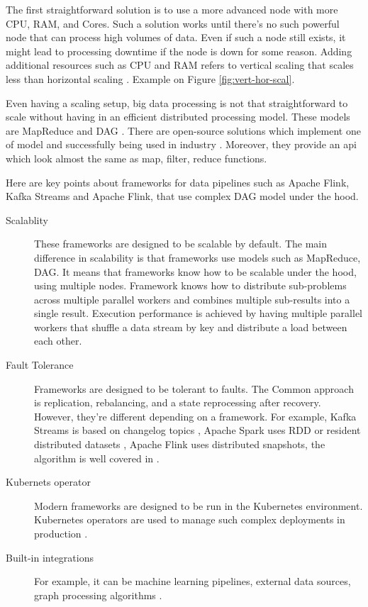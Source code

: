 The first straightforward solution is to use a more advanced node \cite{aws_node_types} with more CPU, RAM, and Cores.
Such a solution works until there's no such powerful node that can process high volumes of data.
Even if such a node still exists, it might lead to processing downtime if the node is down for some reason.
Adding additional resources such as CPU and RAM refers to vertical scaling that scales less than horizontal scaling \cite{vertical_horizontal_scalling_1}.
Example on Figure \ref{fig:vert-hor-scal}.

Even having a scaling setup, big data processing is not that straightforward to scale without having
in an efficient distributed processing model.
These models are MapReduce \cite{map_reduce_google, map_reduce_2, map_reduce_3} and DAG \cite{flink_dag, kafka_streams_topology}.
There are open-source solutions which implement one of model and successfully being used in industry \cite{flinkPoweredBy, netflixStreamingSQL}.
Moreover, they provide an api which
look almost the same as map, filter, reduce functions.

Here are key points about frameworks for data pipelines such as Apache Flink, Kafka Streams and
Apache Flink, that use complex DAG model under the hood.

\begin{description}
    \item[Scalablity] These frameworks are designed to be scalable by default.
    The main difference in scalability is that frameworks use models such as
    MapReduce, DAG.
    It means that frameworks know how to be scalable under the hood,
    using multiple nodes.
    Framework knows how to distribute sub-problems across multiple parallel workers
    and combines multiple sub-results into a single result.
    Execution performance is achieved by having multiple
    parallel workers that shuffle a data stream by key and distribute a load between each other.
    \item[Fault Tolerance] Frameworks are designed to be tolerant to faults.
    The Common approach is replication, rebalancing, and a state reprocessing after recovery.
    However, they're different depending on a framework.
    For example, Kafka Streams is based on changelog topics \cite{confluentKafkaStreamsFaultTolerance},
    Apache Spark uses RDD or resident distributed datasets \cite{Zaharia2012RDD} , Apache Flink
    uses distributed snapshots, the algorithm is well covered in \cite{flinkCheckpoints}.
    \item[Kubernets operator] Modern frameworks are designed to be run in the Kubernetes environment.
    Kubernetes operators are used to manage such complex deployments in production \cite{flink_kubernetes_operator}.
    \item [Built-in integrations] For example, it can be machine learning pipelines, external data sources,
    graph processing algorithms \cite{JMLR:v17:15-237, flink_ml_reseach, flink_ml}.
\end{description}


